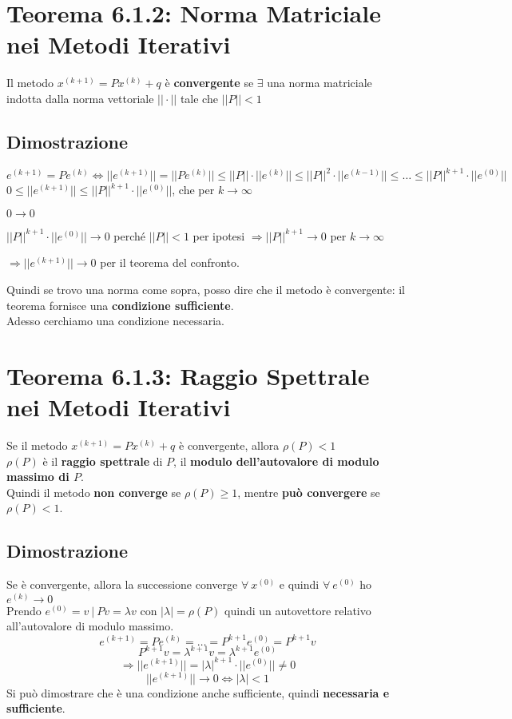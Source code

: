 \documentclass[10pt]{book}
\begin{document}
\section{Teorema 6.1.2: Norma Matriciale nei Metodi Iterativi} Il metodo $x^{(k+1)} = Px^{(k)} + q$ è \textbf{convergente} se $\exists$ una norma matriciale indotta dalla norma vettoriale $||\cdot||$ tale che $||P|| < 1$
\subsection{Dimostrazione} $e^{(k + 1)} = Pe^{(k)} \Leftrightarrow ||e^{(k + 1)}|| = ||Pe^{(k)}|| \leq ||P||\cdot||e^{(k)}|| \leq ||P||^2\cdot||e^{(k-1)}|| \leq \ldots \leq ||P||^{k+1}\cdot||e^{(0)}||$\\
$0 \leq ||e^{(k+1)}|| \leq ||P||^{k+1}\cdot||e^{(0)}||$, che per $k\to\infty$
\begin{list}{}{}
	\item $0\to 0$
	\item $||P||^{k+1}\cdot||e^{(0)}||\to 0$ perché $||P|| < 1$ per ipotesi $\Rightarrow||P||^{k+1}\to 0$ per $k\to\infty$
	\item $\Rightarrow||e^{(k+1)}||\to 0$ per il teorema del confronto.
\end{list}
Quindi se trovo una norma come sopra, posso dire che il metodo è convergente: il teorema fornisce una \textbf{condizione sufficiente}.\\
Adesso cerchiamo una condizione necessaria.
\section{Teorema 6.1.3: Raggio Spettrale nei Metodi Iterativi} Se il metodo $x^{(k+1)} = Px^{(k)} + q$ è convergente, allora $\rho(P) < 1$\\
$\rho(P)$ è il \textbf{raggio spettrale} di $P$, il \textbf{modulo dell'autovalore di modulo massimo di $P$}.\\
Quindi il metodo \textbf{non converge} se $\rho(P) \geq 1$, mentre \textbf{può convergere} se $\rho(P) < 1$.
\subsection{Dimostrazione} Se è convergente, allora la successione converge $\forall\: x^{(0)}$ e quindi $\forall\:e^{(0)}$ ho $e^{(k)}\to 0$\\
Prendo $e^{(0)} = v\:|\: Pv = \lambda v$ con $|\lambda| = \rho(P)$ quindi un autovettore relativo all'autovalore di modulo massimo.
$$e^{(k+1)} = Pe^{(k)} = \ldots = P^{k+1}e^{(0)} = P^{k+1}v$$
$$P^{k+1}v = \lambda^{k+1}v = \lambda^{k+1}e^{(0)}$$
$$\Rightarrow||e^{(k+1)}|| = |\lambda|^{k+1}\cdot||e^{(0)}|| \neq 0$$
$$||e^{(k+1)}||\to 0 \Leftrightarrow |\lambda| < 1$$
Si può dimostrare che è una condizione anche sufficiente, quindi \textbf{necessaria e sufficiente}.
\end{document}
